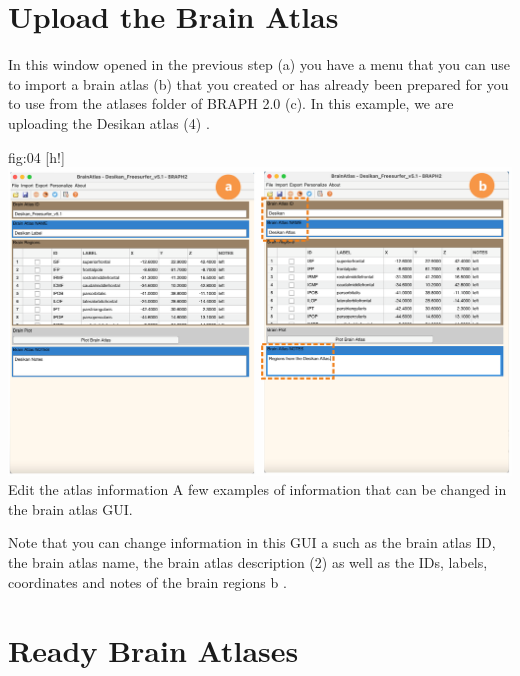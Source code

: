 \documentclass[justified]{tufte-handout}
\begin{document}
\section{Upload the Brain Atlas}

In this window opened in the previous step (a) you have a menu that you can use to import a brain atlas (b) that you created or has already been prepared for you to use from the atlases folder of BRAPH 2.0 (c). In this example, we are uploading the Desikan atlas (4)  . 
	
	{fig:04}
	{
	[h!]
	\includegraphics{tut_ba/fig04.png}
	}
	{Edit the atlas information}
	{
	A few examples of information that can be changed in the brain atlas GUI. 
	}

Note that you can change information in this GUI a such as the brain atlas ID, the brain atlas name, the brain atlas description (2) as well as the IDs, labels, coordinates and notes of the brain regions b .

\clearpage
\section{Ready Brain Atlases}
\end{document}
